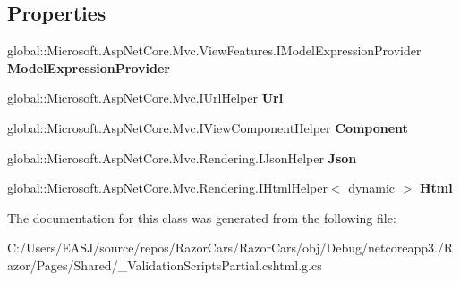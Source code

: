 \subsection*{Properties}
\begin{DoxyCompactItemize}
\item 
\mbox{\label{class_razor_cars_1_1_pages_1_1_shared_1_1_pages___shared_____validation_scripts_partial_ab4dcca03a9c338950b618fed258a9ed6}} 
global\+::\+Microsoft.\+Asp\+Net\+Core.\+Mvc.\+View\+Features.\+I\+Model\+Expression\+Provider {\bfseries Model\+Expression\+Provider}
\item 
\mbox{\label{class_razor_cars_1_1_pages_1_1_shared_1_1_pages___shared_____validation_scripts_partial_ab6a79b3cc1400b67c60b8ce58728d151}} 
global\+::\+Microsoft.\+Asp\+Net\+Core.\+Mvc.\+I\+Url\+Helper {\bfseries Url}
\item 
\mbox{\label{class_razor_cars_1_1_pages_1_1_shared_1_1_pages___shared_____validation_scripts_partial_adc938eab88a55c74f9f247e5646f0a38}} 
global\+::\+Microsoft.\+Asp\+Net\+Core.\+Mvc.\+I\+View\+Component\+Helper {\bfseries Component}
\item 
\mbox{\label{class_razor_cars_1_1_pages_1_1_shared_1_1_pages___shared_____validation_scripts_partial_a9713eb096ce92762fb2cc9a5818e8655}} 
global\+::\+Microsoft.\+Asp\+Net\+Core.\+Mvc.\+Rendering.\+I\+Json\+Helper {\bfseries Json}
\item 
\mbox{\label{class_razor_cars_1_1_pages_1_1_shared_1_1_pages___shared_____validation_scripts_partial_a59a9fed94194a41139e5935023d0fb28}} 
global\+::\+Microsoft.\+Asp\+Net\+Core.\+Mvc.\+Rendering.\+I\+Html\+Helper$<$ dynamic $>$ {\bfseries Html}
\end{DoxyCompactItemize}


The documentation for this class was generated from the following file\+:\begin{DoxyCompactItemize}
\item 
C\+:/\+Users/\+E\+A\+S\+J/source/repos/\+Razor\+Cars/\+Razor\+Cars/obj/\+Debug/netcoreapp3./\+Razor/\+Pages/\+Shared/\+\_\+\+Validation\+Scripts\+Partial.\+cshtml.\+g.\+cs\end{DoxyCompactItemize}
